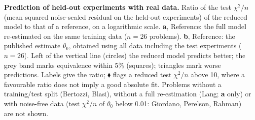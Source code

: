 \caption{\textbf{Prediction of held-out experiments with real data.} Ratio of the test $\chi^2/n$ (mean squared noise-scaled residual on the held-out experiments) of the reduced model to that of a reference, on a logarithmic scale. \textbf{a}, Reference: the full model re-estimated on the same training data ($n=26$ problems). \textbf{b}, Reference: the published estimate $\theta_0$, obtained using all data including the test experiments ($n=26$). Left of the vertical line (circles) the reduced model predicts better; the grey band marks equivalence within 5\% (squares); triangles mark worse predictions. Labels give the ratio; $\blacklozenge$ flags a reduced test $\chi^2/n$ above 10, where a favourable ratio does not imply a good absolute fit. Problems without a training/test split (Bertozzi, Blasi), without a full re-estimation (Lang; \textbf{a} only) or with noise-free data (test $\chi^2/n$ of $\theta_0$ below 0.01: Giordano, Perelson, Rahman) are not shown.}
